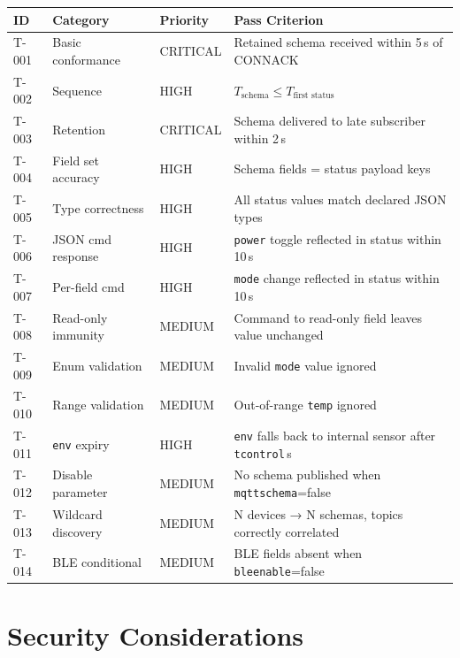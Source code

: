 \documentclass[11pt,a4paper]{article}
\newcommand{\field}[1]{\texttt{\color{codegreen}#1}}
\newcommand{\param}[1]{\texttt{\color{primary}#1}}
\begin{document}
\begin{tabular}{@{}lllp{7cm}@{}}
\toprule
\textbf{ID} & \textbf{Category} & \textbf{Priority} & \textbf{Pass Criterion} \\
\midrule
\rowcolor{lightbg}
T-001 & Basic conformance  & CRITICAL & Retained schema received within 5\,s of CONNACK \\
T-002 & Sequence           & HIGH     & $T_\text{schema} \leq T_\text{first status}$ \\
\rowcolor{lightbg}
T-003 & Retention          & CRITICAL & Schema delivered to late subscriber within 2\,s \\
T-004 & Field set accuracy & HIGH     & Schema fields = status payload keys \\
\rowcolor{lightbg}
T-005 & Type correctness   & HIGH     & All status values match declared JSON types \\
T-006 & JSON cmd response  & HIGH     & \field{power} toggle reflected in status within 10\,s \\
\rowcolor{lightbg}
T-007 & Per-field cmd      & HIGH     & \field{mode} change reflected in status within 10\,s \\
T-008 & Read-only immunity & MEDIUM   & Command to read-only field leaves value unchanged \\
\rowcolor{lightbg}
T-009 & Enum validation    & MEDIUM   & Invalid \field{mode} value ignored \\
T-010 & Range validation   & MEDIUM   & Out-of-range \field{temp} ignored \\
\rowcolor{lightbg}
T-011 & \field{env} expiry & HIGH     & \field{env} falls back to internal sensor after \texttt{tcontrol}\,s \\
T-012 & Disable parameter  & MEDIUM   & No schema published when \param{mqttschema}=false \\
\rowcolor{lightbg}
T-013 & Wildcard discovery & MEDIUM   & N devices → N schemas, topics correctly correlated \\
T-014 & BLE conditional    & MEDIUM   & BLE fields absent when \param{bleenable}=false \\
\bottomrule
\end{tabular}

\section{Security Considerations}
\end{document}
